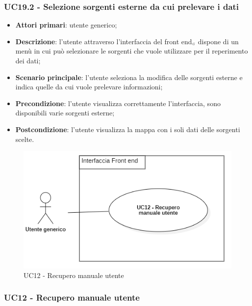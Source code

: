 \subsubsection{UC19.2 - Selezione sorgenti esterne da cui prelevare i dati}\label{CasiDUsoCasiDUsoFacoltativiTraUnUtenteEIlFrontEndElencoCasiDUsoUC112SelezioneSorgentiEsterneDaCuiPrelevareIDati}
\begin{itemize}
	\item \textbf{Attori primari}: utente generico;
	\item \textbf{Descrizione}: l'utente attraverso l'interfaccia del front end$_{\scaleto{G}{3pt}}$ dispone di un menù in cui può selezionare le sorgenti che vuole utilizzare per il reperimento dei dati;
	\item \textbf{Scenario principale}: l'utente seleziona la modifica delle sorgenti esterne e indica quelle da cui vuole prelevare informazioni;
	\item \textbf{Precondizione}: l'utente visualizza correttamente l'interfaccia, sono disponibili varie sorgenti esterne;
	\item \textbf{Postcondizione}: l'utente visualizza la mappa con i soli dati delle sorgenti scelte.
\end{itemize}



\begin{center}
	\begin{figure}[H]
		\centering\includegraphics[scale=0.7]{../immagini/attori_casi/uc12.png}
		\caption{UC12 - Recupero manuale utente}
	\end{figure}
\end{center}


\subsubsection{UC12 - Recupero manuale utente}\label{CasiDUsoCasiDUsoFacoltativiTraUnUtenteEIlFrontEndElencoCasiDUsoUC12RecuperoManualeUtente}



